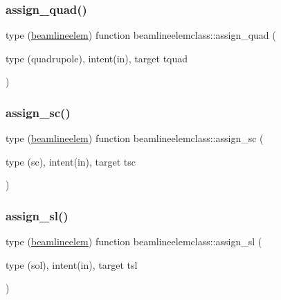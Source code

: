 \mbox{\label{namespacebeamlineelemclass_aad515fd3f566490d835b1d406b23ea12}} 
\subsubsection{\texorpdfstring{assign\_quad()}{assign\_quad()}}
{\footnotesize\ttfamily type (\mbox{\hyperlink{namespacebeamlineelemclass_structbeamlineelemclass_1_1beamlineelem}{beamlineelem}}) function beamlineelemclass\+::assign\+\_\+quad (\begin{DoxyParamCaption}\item[{type (quadrupole), intent(in), target}]{tquad }\end{DoxyParamCaption})}

\mbox{\label{namespacebeamlineelemclass_a1e66e5399a7d4fc6fcfba7e3877f8d2e}} 
\subsubsection{\texorpdfstring{assign\_sc()}{assign\_sc()}}
{\footnotesize\ttfamily type (\mbox{\hyperlink{namespacebeamlineelemclass_structbeamlineelemclass_1_1beamlineelem}{beamlineelem}}) function beamlineelemclass\+::assign\+\_\+sc (\begin{DoxyParamCaption}\item[{type (sc), intent(in), target}]{tsc }\end{DoxyParamCaption})}

\mbox{\label{namespacebeamlineelemclass_ad06dd33f09db1eab5304ec2a865a4b83}} 
\subsubsection{\texorpdfstring{assign\_sl()}{assign\_sl()}}
{\footnotesize\ttfamily type (\mbox{\hyperlink{namespacebeamlineelemclass_structbeamlineelemclass_1_1beamlineelem}{beamlineelem}}) function beamlineelemclass\+::assign\+\_\+sl (\begin{DoxyParamCaption}\item[{type (sol), intent(in), target}]{tsl }\end{DoxyParamCaption})}

